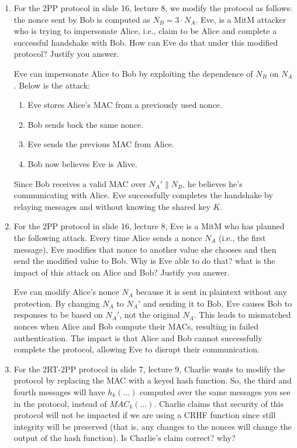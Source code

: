 \documentclass[12pt]{article}
\begin{document}
\begin{enumerate}
    \item For the 2PP protocol in slide 16, lecture 8, we modify the protocol as follows: the nonce sent by Bob is computed as $N_B = 3 \cdot N_A$. Eve, is a MitM attacker who is trying to impersonate Alice, i.e., claim to be Alice and complete a successful handshake with Bob. How can Eve do that under this modified protocol? Justify you answer. \newline

    
    Eve can impersonate Alice to Bob by exploiting the dependence of 
$N_B$ on $N_A$. Below is the attack:

\begin{enumerate}
    \item Eve stores Alice's MAC from a previously used nonce.
    \item Bob sends back the same nonce.
    \item Eve sends the previous MAC from Alice.
    \item Bob now believes Eve is Alive.
\end{enumerate}

Since Bob receives a valid MAC over $N_A' \parallel N_B$, he believes he's communicating with Alice. Eve successfully completes the handshake by relaying messages and without knowing the shared key $K$.

    \item For the 2PP protocol in slide 16, lecture 8, Eve is a MitM who has planned the following attack. Every time Alice sends a nonce $N_A$ (i.e., the first message), Eve modifies that nonce to another value she chooses and then send the modified value to Bob. Why is Eve able to do that? what is the impact of this attack on Alice and Bob? Justify you answer. \newline
    
    Eve can modify Alice's nonce $N_A$ because it is sent in plaintext without any protection. By changing $N_A$ to $N_A'$ and sending it to Bob, Eve causes Bob to responses to be based on $N_A'$, not the original $N_A$. This leads to mismatched nonces when Alice and Bob compute their MACs, resulting in failed authentication. The impact is that Alice and Bob cannot successfully complete the protocol, allowing Eve to disrupt their communication.
    
    \item For the 2RT-2PP protocol in slide 7, lecture 9, Charlie wants to modify the protocol by replacing the MAC with a keyed hash function. So, the third and fourth messages will have $h_k(...)$ computed over the same messages you see in the protocol, instead of $MAC_k(...)$. Charlie claims that security of this protocol will not be impacted if we are using a CRHF function since still integrity will be preserved (that is, any changes to the nonces will change the output of the hash function). Is Charlie's claim correct? why? \newline
    

\end{enumerate}
\end{document}
